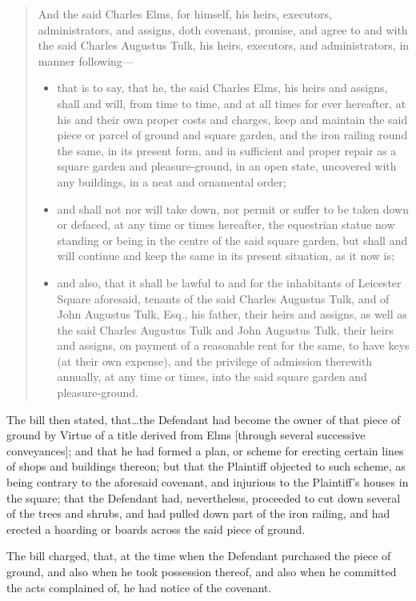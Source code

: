 \begin{quote}
And the said Charles Elms, for himself, his
heirs, executors, administrators, and assigns, doth covenant, promise, and agree
to and with the said Charles Augustus Tulk, his heirs, executors, and
administrators, in manner following---
\begin{itemize}
\item that is to say, that he, the said Charles
Elms, his heirs and assigns, shall and will, from time to time, and at all times
for ever hereafter, at his and their own proper costs and charges, keep and
maintain the said piece or parcel of ground and square garden, and the iron
railing round the same, in its present form, and in sufficient and proper repair
as a square garden and pleasure-ground, in an open state, uncovered with any
buildings, in a neat and ornamental order;
\item and shall not nor will take down, nor
permit or suffer to be taken down or defaced, at any time or times hereafter,
the equestrian statue now standing or being in the centre of the said square
garden, but shall and will continue and keep the same in its present situation,
as it now is;
\item and also, that it shall be lawful to and for the inhabitants of
Leicester Square aforesaid, tenants of the said Charles Augustus Tulk, and of
John Augustus Tulk, Esq., his father, their heirs and assigns, as well as the
said Charles Augustus Tulk and John Augustus Tulk, their heirs and assigns, on
payment of a reasonable rent for the same, to have keys (at their own expense),
and the privilege of admission therewith annually, at any time or times, into
the said square garden and pleasure-ground.
\end{itemize}
\end{quote}

The bill then stated, that\ldots the Defendant had become the owner of that
piece of ground by Virtue of a title derived from Elms [through several
successive conveyances]; and that he had formed a plan, or scheme for erecting
certain lines of shops and buildings thereon; but that the Plaintiff objected to
such scheme, as being contrary to the aforesaid covenant, and injurious to the
Plaintiff's houses in the square; that the Defendant had, nevertheless,
proceeded to cut down several of the trees and shrubs, and had pulled down part
of the iron railing, and had erected a hoarding or boards across the said piece
of ground.

The bill charged, that, at the time when the Defendant purchased the piece of
ground, and also when he took possession thereof, and also when he committed the
acts complained of, he had notice of the covenant.

